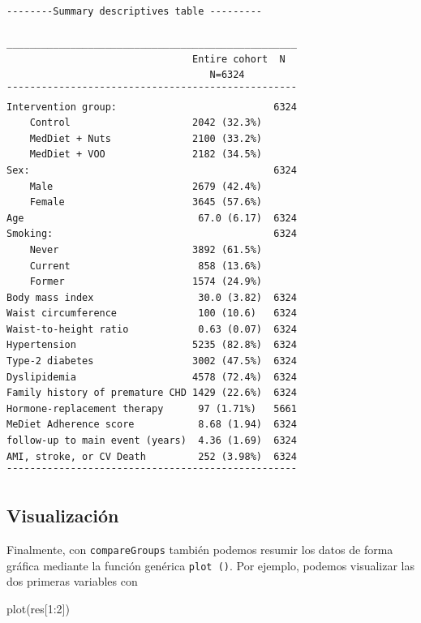 \documentclass[
]{book}
\newenvironment{Shaded}{\begin{snugshade}}{\end{snugshade}}
\newcommand{\DecValTok}[1]{\textcolor[rgb]{0.00,0.00,0.81}{#1}}
\newcommand{\FunctionTok}[1]{\textcolor[rgb]{0.00,0.00,0.00}{#1}}
\newcommand{\NormalTok}[1]{#1}
\newcommand{\SpecialCharTok}[1]{\textcolor[rgb]{0.00,0.00,0.00}{#1}}
\begin{document}
\begin{verbatim}
--------Summary descriptives table ---------

__________________________________________________ 
                                Entire cohort  N   
                                   N=6324          
¯¯¯¯¯¯¯¯¯¯¯¯¯¯¯¯¯¯¯¯¯¯¯¯¯¯¯¯¯¯¯¯¯¯¯¯¯¯¯¯¯¯¯¯¯¯¯¯¯¯ 
Intervention group:                           6324 
    Control                     2042 (32.3%)       
    MedDiet + Nuts              2100 (33.2%)       
    MedDiet + VOO               2182 (34.5%)       
Sex:                                          6324 
    Male                        2679 (42.4%)       
    Female                      3645 (57.6%)       
Age                              67.0 (6.17)  6324 
Smoking:                                      6324 
    Never                       3892 (61.5%)       
    Current                      858 (13.6%)       
    Former                      1574 (24.9%)       
Body mass index                  30.0 (3.82)  6324 
Waist circumference              100 (10.6)   6324 
Waist-to-height ratio            0.63 (0.07)  6324 
Hypertension                    5235 (82.8%)  6324 
Type-2 diabetes                 3002 (47.5%)  6324 
Dyslipidemia                    4578 (72.4%)  6324 
Family history of premature CHD 1429 (22.6%)  6324 
Hormone-replacement therapy      97 (1.71%)   5661 
MeDiet Adherence score           8.68 (1.94)  6324 
follow-up to main event (years)  4.36 (1.69)  6324 
AMI, stroke, or CV Death         252 (3.98%)  6324 
¯¯¯¯¯¯¯¯¯¯¯¯¯¯¯¯¯¯¯¯¯¯¯¯¯¯¯¯¯¯¯¯¯¯¯¯¯¯¯¯¯¯¯¯¯¯¯¯¯¯ 
\end{verbatim}

\hypertarget{visualizaciuxf3n}{%
\subsection*{Visualización}\label{visualizaciuxf3n}}

Finalmente, con \texttt{compareGroups} también podemos resumir los datos de forma gráfica mediante la función genérica \texttt{plot\ ()}. Por ejemplo, podemos visualizar las dos primeras variables con

\begin{Shaded}
\begin{Highlighting}[]
\FunctionTok{plot}\NormalTok{(res[}\DecValTok{1}\SpecialCharTok{:}\DecValTok{2}\NormalTok{])}
\end{Highlighting}
\end{Shaded}
\end{document}
